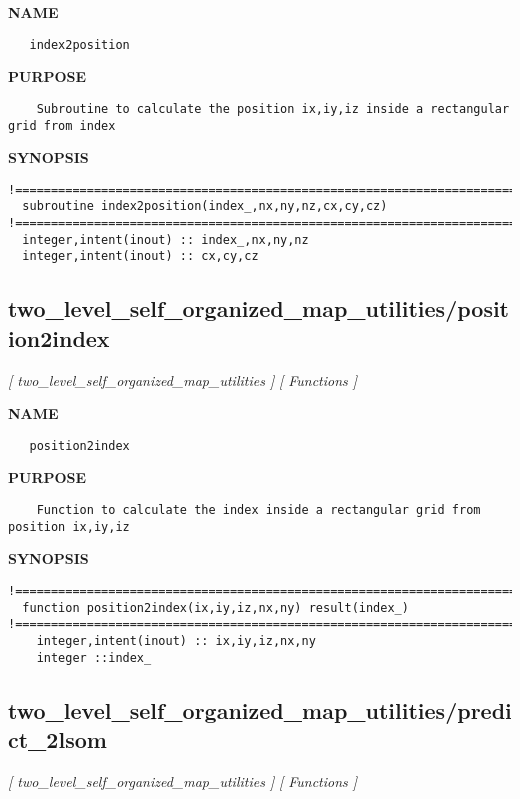 \documentclass{article}
\begin{document}
\label{ch:robo71}
\label{ch:two_level_self_organized_map_utilities_index2position}
\textbf{NAME}
\begin{verbatim}
   index2position
\end{verbatim}
\textbf{PURPOSE}
\begin{verbatim}
    Subroutine to calculate the position ix,iy,iz inside a rectangular grid from index
\end{verbatim}
\textbf{SYNOPSIS}
\begin{verbatim}
!========================================================================================
  subroutine index2position(index_,nx,ny,nz,cx,cy,cz)
!========================================================================================
  integer,intent(inout) :: index_,nx,ny,nz
  integer,intent(inout) :: cx,cy,cz
\end{verbatim}
\newpage
\subsection{two\_level\_self\_organized\_map\_utilities/position2index}
\textsl{[ two\_level\_self\_organized\_map\_utilities ]}
\textsl{[ Functions ]}

\label{ch:robo72}
\label{ch:two_level_self_organized_map_utilities_position2index}
\textbf{NAME}
\begin{verbatim}
   position2index
\end{verbatim}
\textbf{PURPOSE}
\begin{verbatim}
    Function to calculate the index inside a rectangular grid from position ix,iy,iz
\end{verbatim}
\textbf{SYNOPSIS}
\begin{verbatim}
!========================================================================================
  function position2index(ix,iy,iz,nx,ny) result(index_)
!========================================================================================
    integer,intent(inout) :: ix,iy,iz,nx,ny
    integer ::index_
\end{verbatim}
\newpage
\subsection{two\_level\_self\_organized\_map\_utilities/predict\_2lsom}
\textsl{[ two\_level\_self\_organized\_map\_utilities ]}
\textsl{[ Functions ]}
\end{document}
